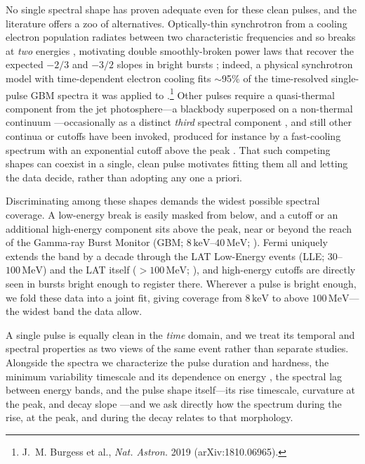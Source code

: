No single spectral shape has proven adequate even for these clean pulses, and the
literature offers a zoo of alternatives. Optically-thin synchrotron from a cooling
electron population radiates between two characteristic frequencies and so breaks
at \emph{two} energies \citep{Sari1998}, motivating double smoothly-broken power
laws that recover the expected $-2/3$ and $-3/2$ slopes in bright bursts
\citep{Oganesyan2017,Oganesyan2018,Ravasio2018,Ravasio2019}; indeed, a physical
synchrotron model with time-dependent electron cooling fits $\sim$95\% of the
time-resolved single-pulse GBM spectra it was applied to
\citep{Burgess2019cool}.\footnote{J.~M. Burgess et al., \textit{Nat. Astron.}
2019 (arXiv:1810.06965).} Other pulses require a quasi-thermal component from the
jet photosphere---a blackbody superposed on a non-thermal continuum
\citep{Ryde2004,Guiriec2010,Guiriec2011,Burgess2014a}---occasionally as a distinct
\emph{third} spectral component \citep{Guiriec2015}, and still other continua or
cutoffs have been invoked, produced for instance by a fast-cooling spectrum with an
exponential cutoff above the peak \citep{Varun2025}. That such competing shapes can
coexist in a single, clean pulse motivates fitting them all and letting the data
decide, rather than adopting any one a priori.

Discriminating among these shapes demands the widest possible spectral coverage. A
low-energy break is easily masked from below, and a cutoff or an additional
high-energy component sits above the peak, near or beyond the reach of the Gamma-ray
Burst Monitor (GBM; $8\,\mathrm{keV}$--$40\,\mathrm{MeV}$; \citealt{Meegan2009}).
Fermi uniquely extends the band by a decade through the LAT Low-Energy events
(LLE; $30$--$100\,\mathrm{MeV}$) and the LAT itself
($>100\,\mathrm{MeV}$; \citealt{Atwood2009}), and high-energy cutoffs are directly
seen in bursts bright enough to register there. Wherever a pulse is bright enough,
we fold these data into a joint fit, giving coverage from $8\,\mathrm{keV}$ to above
$100\,\mathrm{MeV}$---the widest band the data allow.

A single pulse is equally clean in the \emph{time} domain, and we treat its temporal
and spectral properties as two views of the same event rather than separate studies.
Alongside the spectra we characterize the pulse duration and hardness, the minimum
variability timescale and its dependence on energy \citep{Golkhou2014,Golkhou2015},
the spectral lag between energy bands, and the pulse shape itself---its rise
timescale, curvature at the peak, and decay slope
\citep{Norris2005,Kocevski2003,Gowri2025}---and we ask directly how the spectrum
during the rise, at the peak, and during the decay relates to that morphology.

